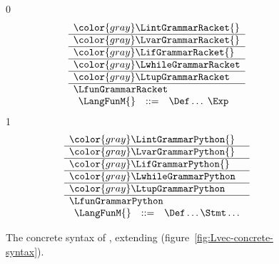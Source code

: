 \documentclass[7x10]{TimesAPriori_MIT}%
\newcommand{\gray}[1]{{\color{gray} #1}}
\def\racketEd{0}
\def\pythonEd{1}
\providecommand{\BookEdition}{1}
\let\edition\BookEdition
\newcommand{\pythonColor}[0]{}
\numberwithin{theorem}{chapter}
\numberwithin{definition}{chapter}
\numberwithin{equation}{chapter}
\begin{document}
\begin{figure}[tp]
\centering
\begin{tcolorbox}[colback=white]
    \small
{\if\edition\racketEd    
\[
\begin{array}{l}
  \gray{\LintGrammarRacket{}} \\ \hline
  \gray{\LvarGrammarRacket{}} \\ \hline
  \gray{\LifGrammarRacket{}} \\ \hline
  \gray{\LwhileGrammarRacket} \\ \hline
  \gray{\LtupGrammarRacket} \\   \hline
  \LfunGrammarRacket \\  
  \begin{array}{lcl}
  \LangFunM{} &::=& \Def \ldots \; \Exp
  \end{array}
\end{array}
\]
\fi}
{\if\edition\pythonEd\pythonColor
\[
\begin{array}{l}
  \gray{\LintGrammarPython{}} \\ \hline
  \gray{\LvarGrammarPython{}} \\ \hline
  \gray{\LifGrammarPython{}} \\ \hline
  \gray{\LwhileGrammarPython} \\ \hline
  \gray{\LtupGrammarPython} \\  \hline
  \LfunGrammarPython \\
\begin{array}{rcl}
  \LangFunM{} &::=& \Def\ldots \Stmt\ldots
\end{array}
\end{array}
\]
\fi}
\end{tcolorbox}

\caption{The concrete syntax of \LangFun{}, extending \LangVec{} (figure~\ref{fig:Lvec-concrete-syntax}).}
\label{fig:Lfun-concrete-syntax}
\end{figure}
\end{document}
